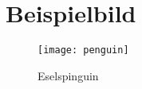 \section{Beispielbild}
\begin{figure}[h]
    \centering
    \texttt{[image: penguin]}
    \caption{Eselspinguin}
    \label{fig:penguin}
\end{figure}